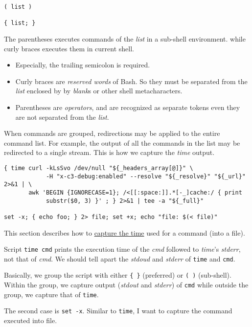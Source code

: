 \begin{lstlisting}
( list )

{ list; }
\end{lstlisting}

The parentheses executes commands of the \textit{list} in a
sub-shell environment. while curly braces executes them in current
shell.

\begin{itemize}
\item Especially, the trailing semicolon is required.
\item Curly braces are \textit{reserved words} of Bash. So they must be
  separated from the \textit{list} enclosed by by \textit{blank}s
  or other shell metacharacters.
\item Parentheses are \textit{operators}, and are recognized as
  separate tokens even they are not separated from the \textit{list}.
\end{itemize}

When commands are grouped, redirections may be
applied to the entire command list. For example, the output of all
the commands in the list may be redirected to a single
stream. This is how we capture the \textit{time} output.

\begin{lstlisting}
{ time curl -kLsSvo /dev/null "${_headers_array[@]}" \
            -H "x-c3-debug:enabled" --resolve "${_resolve}" "${_url}" 2>&1 | \
       awk 'BEGIN {IGNORECASE=1}; /<[[:space:]].*[-_]cache:/ { print
            substr($0, 3) }' ; } 2>&1 | tee -a "${_full}"

set -x; { echo foo; } 2> file; set +x; echo "file: $(< file)"
\end{lstlisting}

This section describes how to
\href{http://mywiki.wooledge.org/BashFAQ/032}{capture the time}
used for a command (into a file).

Script \lstinline|time cmd| prints the execution time of the
\textit{cmd} followed to \textit{time}'s \textit{stderr}, not that
of \textit{cmd}. We should tell apart the \textit{stdoud} and
\textit{stderr} of \lstinline|time| and \lstinline|cmd|.

Basically, we group the script with either \lstinline|{ }|
(preferred) or \lstinline|( )| (sub-shell). Within the group, we
capture output (\textit{stdout} and \textit{stderr}) of
\lstinline|cmd| while outside the group, we capture that of
\lstinline|time|.

The second case is \lstinline|set -x|. Similar to
\lstinline|time|, I want to capture the command executed into file.

